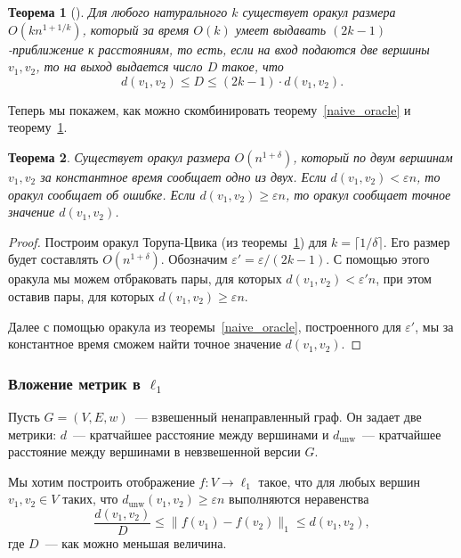\documentclass[12pt]{article}
\newcommand{\eps}{\varepsilon}
\newcommand{\dunw}{d_{\mathrm{unw}}}
\newtheorem{theorem}{Теорема}
\begin{document}
    \begin{theorem}[\cite{TZ05}]
        \label{thorup_zwick}
        Для любого натурального $k$ существует оракул размера $O(kn^{1 + 1/k})$, который за время $O(k)$
        умеет выдавать $(2k - 1)$-приближение к расстояниям, то есть, если на вход подаются две вершины $v_1, v_2$,
        то на выход выдается число $D$ такое, что
        $$
            d(v_1, v_2) \leq D \leq (2k - 1) \cdot d(v_1, v_2).
        $$
    \end{theorem}

    Теперь мы покажем, как можно скомбинировать теорему~\ref{naive_oracle} и теорему~\ref{thorup_zwick}.

    \begin{theorem}
        Существует оракул размера $O(n^{1 + \delta})$, который по двум вершинам $v_1, v_2$ за константное время
        сообщает одно из двух.
        Если $d(v_1, v_2) < \eps n$, то оракул сообщает об ошибке. Если $d(v_1, v_2) \geq \eps n$,
        то оракул сообщает точное значение $d(v_1, v_2)$.
    \end{theorem}
    \begin{proof}
        Построим оракул Торупа-Цвика (из теоремы~\ref{thorup_zwick}) для $k = \lceil 1 / \delta \rceil$.
        Его размер будет составлять $O(n^{1 + \delta})$. Обозначим $\eps' = \eps / (2k - 1)$.
        С помощью этого оракула мы можем отбраковать пары, для которых $d(v_1, v_2) < \eps' n$, при этом
        оставив пары, для которых $d(v_1, v_2) \geq \eps n$.

        Далее с помощью оракула из теоремы~\ref{naive_oracle}, построенного для $\eps'$, мы за константное время
        сможем найти точное значение $d(v_1, v_2)$.
    \end{proof}
    \subsubsection{Вложение метрик в $\ell_1$}
    \label{subsubsection_metric_embeddings}
    Пусть $G = (V, E, w)$~--- взвешенный ненаправленный граф. Он задает две метрики: $d$~--- кратчайшее расстояние
    между вершинами и $\dunw$~--- кратчайшее расстояние между вершинами в невзвешенной версии $G$.

    Мы хотим построить отображение $f \colon V \to \ell_1$ такое, что для любых вершин $v_1, v_2 \in V$ таких,
    что $\dunw(v_1, v_2) \geq \eps n$ выполняются неравенства
    $$
        \frac{d(v_1, v_2)}{D} \leq \|f(v_1) - f(v_2)\|_1 \leq d(v_1, v_2),
    $$
    где $D$~--- как можно меньшая величина.
\end{document}
